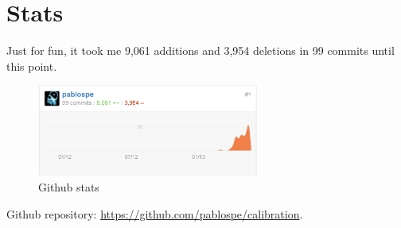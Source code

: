 \vspace*{-2ex}
\section{Stats}
Just for fun, it took me 9,061 additions and 3,954 deletions in 99 commits until this point.
\begin{figure}[!htbp]
 \centering
 \includegraphics[width=0.65\textwidth]{images/git_stats.png}
 \caption{Github stats}
 \label{fig:triangulation_fails}
\end{figure}

Github repository: \url{https://github.com/pablospe/calibration}.

%
%

